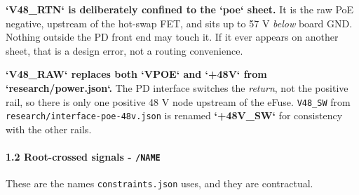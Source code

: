\documentclass[11pt,a4paper]{article}
\begin{document}
\textbf{`V48\_RTN` is deliberately confined to the `poe` sheet.} It is the raw PoE negative, upstream of the hot-swap FET, and sits up to 57 V \emph{below} board GND. Nothing outside the PD front end may touch it. If it ever appears on another sheet, that is a design error, not a routing convenience.

\textbf{`V48\_RAW` replaces both `VPOE` and `+48V` from `research/power.json`.} The PD interface switches the \emph{return}, not the positive rail, so there is only one positive 48 V node upstream of the eFuse. \texttt{V48\_SW} from \texttt{research/interface-poe-48v.json} is renamed \textbf{`+48V\_SW`} for consistency with the other rails.

\paragraph*{1.2 Root-crossed signals - \texttt{/NAME}}
These are the names \texttt{constraints.json} uses, and they are contractual.
\end{document}
